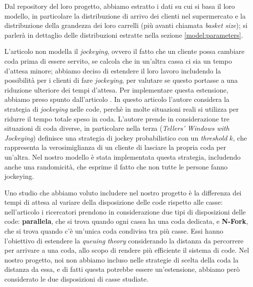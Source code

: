 Dal repository del loro progetto, abbiamo estratto i dati su cui si basa il loro modello, in particolare la distribuzione di arrivo dei clienti nel supermercato e la distribuzione della grandezza dei loro carrelli (più avanti chiamata \textit{basket size}); si parlerà in dettaglio delle distribuzioni estratte nella sezione \ref{model:parameters}.

L'articolo \cite{article1} non modella il \textit{jockeying}, ovvero il fatto che un cliente possa cambiare coda prima di essere servito, se calcola che in un'altra cassa ci sia un tempo d'attesa minore; abbiamo deciso di estendere il loro lavoro includendo la possibilità per i clienti di fare \textit{jockeying}, per valutare se questo portasse a una riduzione ulteriore dei tempi d'attesa. Per implementare questa estensione, abbiamo preso spunto dall'articolo \cite{koenigsberg1966jockeying}.
In questo articolo l'autore considera la strategia di \textit{jockeying} nelle code, perchè in molte situazioni reali si utilizza per ridurre il tempo totale speso in coda. L'autore prende in considerazione tre situazioni di coda diverse, in particolare nella terza (\textit{Tellers' Windows with Jockeying}) definisce una strategia di jockey probabilistico con un \textit{threshold} $k$, che rappresenta la verosimiglianza di un cliente di lasciare la propria coda per un'altra. Nel nostro modello è stata implementata questa strategia, includendo anche una randomicità, che esprime il fatto che non tutte le persone fanno jockeying.

Uno studio che abbiamo voluto includere nel nostro progetto è la differenza dei tempi di attesa al variare della disposizione delle code rispetto alle casse: nell'articolo \cite{yanagisawa2011methods} i ricercatori prendono in considerazione due tipi di disposizioni delle code: \textbf{parallela}, che si trova quando ogni cassa ha una coda dedicata, e \textbf{N-Fork}, che si trova quando c'è un'unica coda condivisa tra più casse. Essi hanno l'obiettivo di estendere la \textit{queuing theory} considerando la distanza da percorrere per arrivare a una coda, allo scopo di rendere più efficiente il sistema di code. Nel nostro progetto, noi non abbiamo incluso nelle strategie di scelta della coda la distanza da essa, e di fatti questa potrebbe essere un'estensione, abbiamo però considerato le due disposizioni di casse studiate. 

